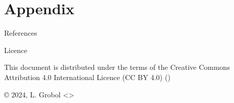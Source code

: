 \documentclass[
	xcolor={svgnames},
	aspectratio=169,
	french,
]{beamer}
\begin{document}

\hypersetup{bookmarksdepth=0}  %
\appendix
\hypersetup{bookmarksdepth=2}
\section{Appendix}

\begin{frame}[allowframebreaks]{References}
	\printbibliography[heading=none]
\end{frame}

\begin{frame}{Licence}
	\begin{english}
		\begin{center}
			{\huge \ccby}
			\vfill
			This document is distributed under the terms of the Creative Commons Attribution 4.0 International Licence (CC BY 4.0) ()

			\vfill
			© 2024, L. Grobol <>

		\end{center}
	\end{english}
\end{frame}
\end{document}
